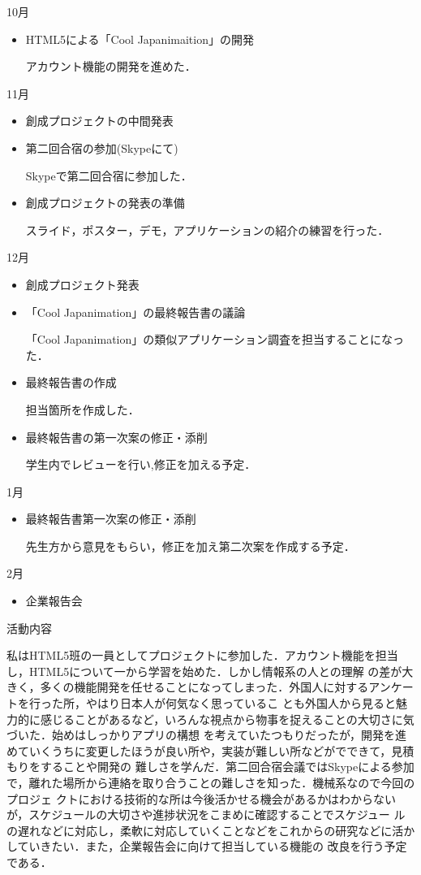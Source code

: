 10月
\begin{itemize}
\item HTML5による「Cool Japanimaition」の開発
\par アカウント機能の開発を進めた．
\end{itemize}
11月
\begin{itemize}
\item 創成プロジェクトの中間発表
\item	第二回合宿の参加(Skypeにて)
\par Skypeで第二回合宿に参加した．
\item 創成プロジェクトの発表の準備
\par スライド，ポスター，デモ，アプリケーションの紹介の練習を行った．
\end{itemize}
12月
\begin{itemize}
\item 創成プロジェクト発表
\item 「Cool Japanimation」の最終報告書の議論
\par 「Cool Japanimation」の類似アプリケーション調査を担当することになった．
\item 最終報告書の作成
\par 担当箇所を作成した．
\item 最終報告書の第一次案の修正・添削
\par 学生内でレビューを行い,修正を加える予定．
\end{itemize}
1月
\begin{itemize}
\item 最終報告書第一次案の修正・添削
\par 先生方から意見をもらい，修正を加え第二次案を作成する予定．
\end{itemize}
2月
\begin{itemize}
\item 企業報告会
\end{itemize}
\par
活動内容
\par
私はHTML5班の一員としてプロジェクトに参加した．アカウント機能を担当し，HTML5について一から学習を始めた．しかし情報系の人との理解
の差が大きく，多くの機能開発を任せることになってしまった．外国人に対するアンケートを行った所，やはり日本人が何気なく思っているこ
とも外国人から見ると魅力的に感じることがあるなど，いろんな視点から物事を捉えることの大切さに気づいた．始めはしっかりアプリの構想
を考えていたつもりだったが，開発を進めていくうちに変更したほうが良い所や，実装が難しい所などがでできて，見積もりをすることや開発の
難しさを学んだ．第二回合宿会議ではSkypeによる参加で，離れた場所から連絡を取り合うことの難しさを知った．機械系なので今回のプロジェ
クトにおける技術的な所は今後活かせる機会があるかはわからないが，スケジュールの大切さや進捗状況をこまめに確認することでスケジュー
ルの遅れなどに対応し，柔軟に対応していくことなどをこれからの研究などに活かしていきたい．また，企業報告会に向けて担当している機能の
改良を行う予定である．
　

